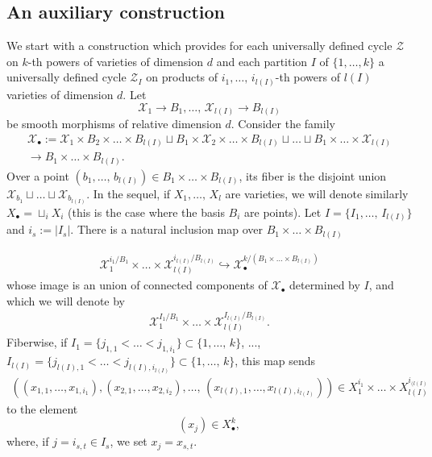 \documentclass[10pt]{article}
\begin{document}
\subsection{An auxiliary  construction \label{sectiontrick}}
We start with a construction which provides for  each universally defined cycle $\mathcal{Z}$ on $k$-th powers of varieties of dimension
$d$  and   each partition $I$ of
$\{1,\ldots,k\}$  a universally defined cycle
$\mathcal{Z}_I$ on products of  $i_1,\ldots,\,i_{l(I)}$-th powers of  $l(I)$ varieties of dimension $d$.
Let $$\mathcal{X}_1\rightarrow B_1,\ldots,\, \mathcal{X}_{l(I)}\rightarrow B_{l(I)}$$ be smooth morphisms of relative dimension $d$.
Consider the family
\begin{eqnarray}
\label{eqfamillytrick} \mathcal{X}_\bullet:=\mathcal{X}_1\times B_2\times\ldots\times B_{l(I)}\sqcup B_1\times \mathcal{X}_2\times\ldots\times B_{l(I)}\sqcup \ldots\sqcup  B_1\times\ldots\times \mathcal{X}_{l(I)}\\
\nonumber \rightarrow B_1\times\ldots\times B_{l(I)}.
\end{eqnarray}
Over a point $(b_1,\ldots,\,b_{l(I)})\in B_1\times\ldots\times B_{l(I)}$,  its fiber is the disjoint union $\mathcal{X}_{b_1}\sqcup\ldots\sqcup \mathcal{X}_{b_{l(I)}}$. In the sequel, if
$X_1,\ldots,\,X_l$ are varieties, we will denote similarly $X_\bullet=\sqcup_iX_i$ (this is the case where the basis  $B_i$  are points).
Let $I=\{I_1,\ldots,\,I_{l(I)}\}$ and $i_s:=|I_s|$. There is a natural inclusion map over $B_{1}\times\ldots\times B_{l(I)}$

\begin{eqnarray}
\label{eqcomponetnttrick}\mathcal{X}_1^{i_1/B_1}\times\ldots\times \mathcal{X}_{l(I)}^{i_{l(I)}/B_{l(I)}}
\hookrightarrow \mathcal{X}_\bullet^{k/(B_1\times\ldots\times B_{l(I)})}
\end{eqnarray}
whose image is an union of connected components of $\mathcal{X}_\bullet$ determined by $I$, and  which we will denote by \begin{eqnarray}\label{eqnameofcomponent}\mathcal{X}_1^{I_1/B_1}\times\ldots\times \mathcal{X}_{l(I)}^{I_{l(I)}/B_{l(I)}}.\end{eqnarray}
  Fiberwise, if $I_1=\{j_{1,1}<\ldots <j_{1,i_1}\}\subset \{1,\ldots,\,k\}$,
..., $I_{l(I)}=\{j_{l(I),1}<\ldots <j_{l(I),i_{l(I)}}\}\subset \{1,\ldots,\,k\}$,  this map sends
\begin{eqnarray}
\label{eqmapI}((x_{1,1},\ldots,x_{1, i_1}),(x_{2,1},\ldots,x_{2, i_2}),\ldots,\,(x_{l(I),1},\ldots,x_{l(I), i_{l(I)}}))\in X_1^{i_1}\times \ldots\times X_{l(I)}^{i_{(l(I)}}\end{eqnarray}
to the  element
$$(x_{j})\in  X_\bullet^k,$$ where, if $j=i_{s,t}\in I_s$, we set
$x_j=x_{s,t}$.
\end{document}
